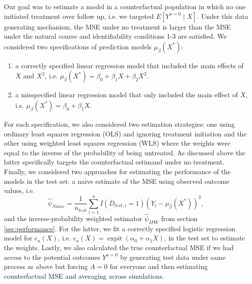 Our goal was to estimate a model in a counterfactual population in which no one initiated treatment over follow up, i.e. we targeted $E[Y^{a=0} \mid X]$. Under this data generating mechanism, the MSE under no treatment is larger than the MSE under the natural course and identifiability conditions 1-3 are satisfied. We considered two specifications of prediction models $\mu_{\beta}(X^*)$:
\begin{enumerate}
    \item a correctly specified linear regression model that included the main effects of $X$ and $X^2$, i.e. $\mu_{\beta}(X^*) = \beta_0 + \beta_1 X + \beta_2 X^2$.
    \item a misspecified linear regression model that only included the main effect of $X$, i.e. $\mu_{\beta}(X^*) = \beta_0 + \beta_1 X$.
\end{enumerate} 
For each specification, we also considered two estimation strategies: one using ordinary least squares regression (OLS) and ignoring treatment initiation and the other using weighted least squares regression (WLS) where the weights were equal to the inverse of the probability of being untreated. As discussed above the latter specifically targets the counterfactual estimand under no treatment. Finally, we considered two approaches for estimating the performance of the models in the test set: a naive estimate of the MSE using observed outcome values, i.e. 
$$\widehat{\psi}_{Naive} = \frac{1}{n_{test}} \sum_{i=1}^n I(D_{test,i} = 1) (Y_i - \mu_{\widehat{\beta}}(X^*))^2,$$ 
and the inverse-probability weighted estimator $\widehat{\psi}_{IPW}$ from section \ref{sec:performance}. For the latter, we fit a correctly specified logistic regression model for $e_a(X)$, i.e. $e_a(X) = \operatorname{expit}(\alpha_0 + \alpha_1 X)$, in the test set to estimate the weights. Lastly, we also calculated the true counterfactual MSE if we had access to the potential outcomes $Y^{a=0}$ by generating test data under same process as above but forcing $A = 0$ for everyone and then estimating counterfactual MSE and averaging across simulations.

